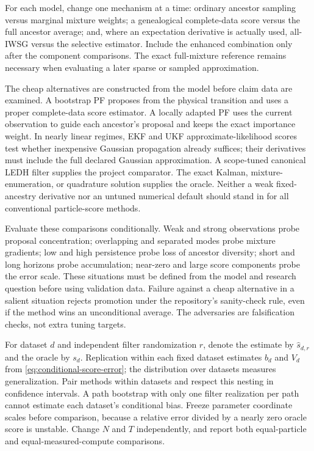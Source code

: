 \documentclass[11pt]{article}
\begin{document}
For each model, change one mechanism at a time: ordinary ancestor sampling
versus marginal mixture weights; a genealogical complete-data score versus
the full ancestor average; and, where an expectation derivative is actually
used, all-IWSG versus the selective estimator. Include the enhanced
combination only after the component comparisons. The exact full-mixture
reference remains necessary when evaluating a later sparse or sampled
approximation.

The cheap alternatives are constructed from the model before claim data are
examined. A bootstrap PF proposes from the physical transition and uses a
proper complete-data score estimator. A locally adapted PF uses the current
observation to guide each ancestor's proposal and keeps the exact importance
weight. In nearly linear regimes, EKF and UKF approximate-likelihood scores
test whether inexpensive Gaussian propagation already suffices; their
derivatives must include the full declared Gaussian approximation. A
scope-tuned canonical LEDH filter supplies the project comparator. The exact
Kalman, mixture-enumeration, or quadrature solution supplies the oracle.
Neither a weak fixed-ancestry derivative nor an untuned numerical default
should stand in for all conventional particle-score methods.

Evaluate these comparisons conditionally. Weak and strong observations probe
proposal concentration; overlapping and separated modes probe mixture
gradients; low and high persistence probe loss of ancestor diversity; short
and long horizons probe accumulation; near-zero and large score components
probe the error scale. These situations must be defined from the model and
research question before using validation data. Failure against a cheap
alternative in a salient situation rejects promotion under the repository's
sanity-check rule, even if the method wins an unconditional average. The
adversaries are falsification checks, not extra tuning targets.

For dataset $d$ and independent filter randomization $r$, denote the estimate
by $\widehat s_{d,r}$ and the oracle by $s_d$. Replication within each fixed
dataset estimates $b_d$ and $V_d$ from
\eqref{eq:conditional-score-error}; the distribution over datasets measures
generalization. Pair methods within datasets and respect this nesting in
confidence intervals. A path bootstrap with only one filter realization per
path cannot estimate each dataset's conditional bias. Freeze parameter
coordinate scales before comparison, because a relative error divided by a
nearly zero oracle score is unstable. Change $N$ and $T$ independently, and
report both equal-particle and equal-measured-compute comparisons.
\end{document}
